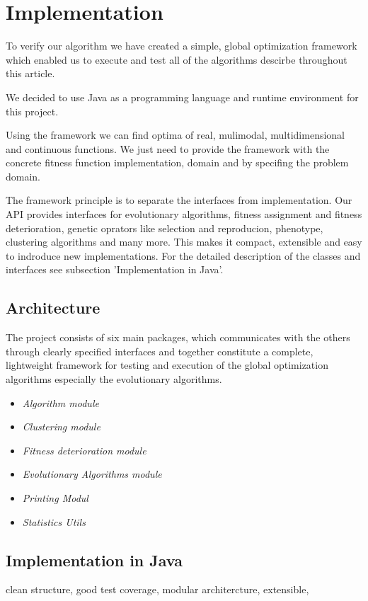 

\chapter{Implementation}
\label{Implementation}
To verify our algorithm we have created a simple, global optimization framework
which enabled us to execute and test all of the algorithms descirbe throughout
this article.

We decided to use Java \cite{java} as a programming language and runtime
environment for this project. 

Using the framework we can find optima of real, mulimodal, multidimensional and
continuous functions. We just need to provide the framework with the concrete
fitness function implementation, domain and by specifing the problem domain.

The framework principle is to separate the interfaces from implementation.
Our API provides interfaces for evolutionary algorithms, fitness assignment
and fitness deterioration, genetic oprators like selection and reproducion,
phenotype, clustering algorithms and many more. This makes it compact,
extensible and easy to indroduce new implementations.
For the detailed description of the classes and interfaces see subsection
'Implementation in Java'.  

\section{Architecture}

The project consists of six main packages, which communicates with the
others through clearly specified interfaces and together constitute a
complete, lightweight framework for testing and execution of the global 
optimization algorithms especially the evolutionary algorithms.
\begin{itemize}
  \item \textit{Algorithm module}
  \item \textit{Clustering module}
  \item \textit{Fitness deterioration module}
  \item \textit{Evolutionary Algorithms module}
  \item \textit{Printing Modul}
  \item \textit{Statistics Utils}
\end{itemize}

\section{Implementation in Java}
clean structure, good test coverage, 
modular architercture, extensible,


